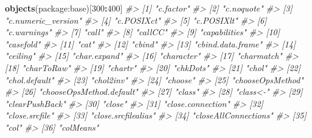 \documentclass[
]{book}
\newenvironment{Shaded}{\begin{snugshade}}{\end{snugshade}}
\newcommand{\CommentTok}[1]{\textcolor[rgb]{0.56,0.35,0.01}{\textit{#1}}}
\newcommand{\DecValTok}[1]{\textcolor[rgb]{0.00,0.00,0.81}{#1}}
\newcommand{\FunctionTok}[1]{\textcolor[rgb]{0.13,0.29,0.53}{\textbf{#1}}}
\newcommand{\NormalTok}[1]{#1}
\newcommand{\SpecialCharTok}[1]{\textcolor[rgb]{0.81,0.36,0.00}{\textbf{#1}}}
\newcommand{\StringTok}[1]{\textcolor[rgb]{0.31,0.60,0.02}{#1}}
\begin{document}
\begin{Shaded}
\begin{Highlighting}[]
\FunctionTok{objects}\NormalTok{(}\StringTok{\textquotesingle{}package:base\textquotesingle{}}\NormalTok{)[}\DecValTok{300}\SpecialCharTok{:}\DecValTok{400}\NormalTok{]}
\CommentTok{\#\textgreater{}   [1] "c.factor"                  }
\CommentTok{\#\textgreater{}   [2] "c.noquote"                 }
\CommentTok{\#\textgreater{}   [3] "c.numeric\_version"         }
\CommentTok{\#\textgreater{}   [4] "c.POSIXct"                 }
\CommentTok{\#\textgreater{}   [5] "c.POSIXlt"                 }
\CommentTok{\#\textgreater{}   [6] "c.warnings"                }
\CommentTok{\#\textgreater{}   [7] "call"                      }
\CommentTok{\#\textgreater{}   [8] "callCC"                    }
\CommentTok{\#\textgreater{}   [9] "capabilities"              }
\CommentTok{\#\textgreater{}  [10] "casefold"                  }
\CommentTok{\#\textgreater{}  [11] "cat"                       }
\CommentTok{\#\textgreater{}  [12] "cbind"                     }
\CommentTok{\#\textgreater{}  [13] "cbind.data.frame"          }
\CommentTok{\#\textgreater{}  [14] "ceiling"                   }
\CommentTok{\#\textgreater{}  [15] "char.expand"               }
\CommentTok{\#\textgreater{}  [16] "character"                 }
\CommentTok{\#\textgreater{}  [17] "charmatch"                 }
\CommentTok{\#\textgreater{}  [18] "charToRaw"                 }
\CommentTok{\#\textgreater{}  [19] "chartr"                    }
\CommentTok{\#\textgreater{}  [20] "chkDots"                   }
\CommentTok{\#\textgreater{}  [21] "chol"                      }
\CommentTok{\#\textgreater{}  [22] "chol.default"              }
\CommentTok{\#\textgreater{}  [23] "chol2inv"                  }
\CommentTok{\#\textgreater{}  [24] "choose"                    }
\CommentTok{\#\textgreater{}  [25] "chooseOpsMethod"           }
\CommentTok{\#\textgreater{}  [26] "chooseOpsMethod.default"   }
\CommentTok{\#\textgreater{}  [27] "class"                     }
\CommentTok{\#\textgreater{}  [28] "class\textless{}{-}"                   }
\CommentTok{\#\textgreater{}  [29] "clearPushBack"             }
\CommentTok{\#\textgreater{}  [30] "close"                     }
\CommentTok{\#\textgreater{}  [31] "close.connection"          }
\CommentTok{\#\textgreater{}  [32] "close.srcfile"             }
\CommentTok{\#\textgreater{}  [33] "close.srcfilealias"        }
\CommentTok{\#\textgreater{}  [34] "closeAllConnections"       }
\CommentTok{\#\textgreater{}  [35] "col"                       }
\CommentTok{\#\textgreater{}  [36] "colMeans"                  }

\end{Highlighting}
\end{Shaded}
\end{document}
